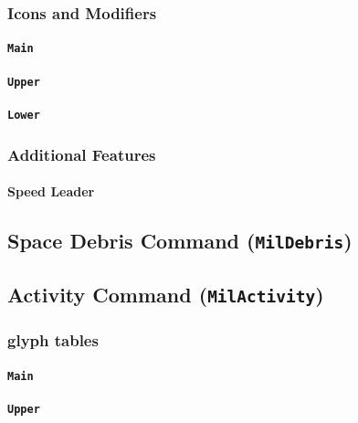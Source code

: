 \documentclass[a4paper, titlepage]{article}
\begin{document}
\subsubsection{Icons and Modifiers}

\paragraph{\texttt{Main}}
%

\paragraph{\texttt{Upper}}
%

\paragraph{\texttt{Lower}}
%

\subsubsection{Additional Features}

\paragraph{Speed Leader}

\subsection{Space Debris Command (\textbf{\texttt{MilDebris}})}

\subsection{Activity Command (\textbf{\texttt{MilActivity}})}

\subsubsection{glyph tables}

\paragraph{\texttt{Main}}
%

\paragraph{\texttt{Upper}}
%
\end{document}
